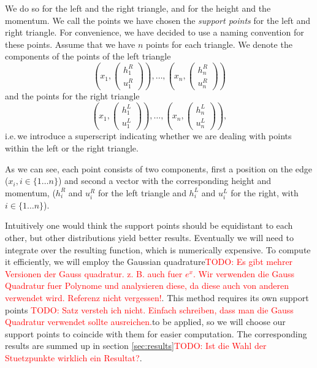 \documentclass{article}
\newcommand{\todo}[2][]{\textcolor{red}{TODO\ifthenelse{\equal{#1}{}}{}{[#1]}: #2}}
\begin{document}
We do so for the left and the right triangle, and for the height and the momentum. We call the points we have chosen the \emph{support points} for the left and right triangle. For convenience, we have decided to use a naming convention for these points.
Assume that we have $n$ points for each triangle.
We denote the components of the points of the left triangle
\begin{equation*}
\left(x_1,\begin{pmatrix}
    h_1^R \\ u_1^R
  \end{pmatrix}\right), \dots , \left(x_n, \begin{pmatrix}
    h_n^R \\ u_n^R
  \end{pmatrix}\right)
\end{equation*}
and the points for the right triangle
\begin{equation*}
\left(x_1,\begin{pmatrix}
    h_1^L \\ u_1^L
  \end{pmatrix}\right), \dots , \left(x_n,\begin{pmatrix}
    h_n^L \\ u_n^L
  \end{pmatrix}\right),
\end{equation*}
i.e.\,we introduce a superscript indicating whether we are dealing with points within the left or the right triangle.

As we can see, each point consists of two components, first a position on the edge ($x_i, i \in \{1 \dots n\}$) and second a vector with the corresponding height and momentum, ($h_i^R$ and $u_i^R$ for the left triangle and $h_i^L$ and $u_i^L$ for the right, with $i \in \{1 \dots n\}$).

Intuitively one would think the support points should be equidistant to each other, but other distributions yield better results.
Eventually we will need to integrate over the resulting function, which is numerically expensive. To compute it efficiently, we will employ the Gaussian quadrature\todo{Es gibt mehrer Versionen der Gauss quadratur. z. B. auch fuer $e^x$. Wir verwenden die Gauss Quadratur fuer Polynome und analysieren diese, da diese auch von anderen verwendet wird. Referenz nicht vergessen!}. This method requires its own support points \todo{Satz versteh ich nicht. Einfach schreiben, dass man die Gauss Quadratur verwendet sollte ausreichen.}to be applied, so we will choose our support points to coincide with them for easier computation. The corresponding results are summed up in section \ref{sec:results}\todo{Ist die Wahl der Stuetzpunkte wirklich ein Resultat?}.
\end{document}
